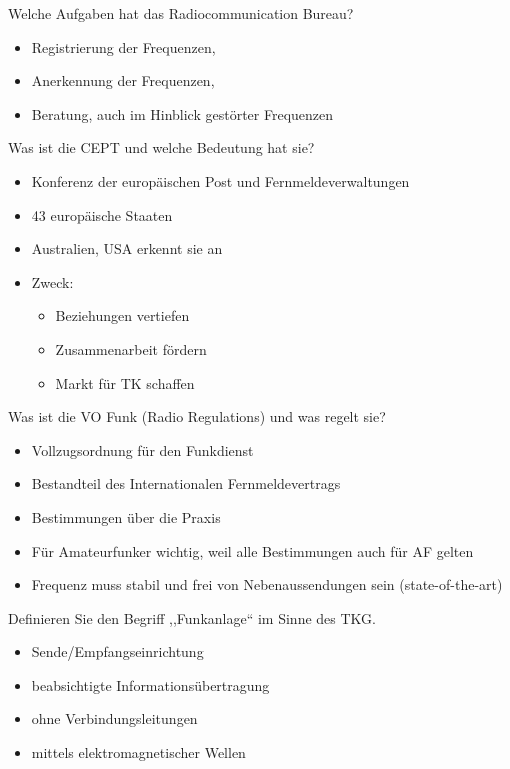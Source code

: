\documentclass[avery5371,grid,frame,a4paper]{flashcards}
\newcommand{\card}[3]{
  \begin{flashcard}[{\chap} -- #1]{#2}#3\end{flashcard}
}
\begin{document}
\card{04}{Welche Aufgaben hat das Radiocommunication Bureau?}{
  \begin{itemize}
    \item Registrierung der Frequenzen,
    \item Anerkennung der Frequenzen,
    \item Beratung, auch im Hinblick gestörter Frequenzen
 \end{itemize}
}
\card{05}{Was ist die CEPT und welche Bedeutung hat sie?}{
  \begin{itemize}
    \item Konferenz der europäischen Post und Fernmeldeverwaltungen
    \item 43 europäische Staaten
    \item Australien, USA erkennt sie an
    \item Zweck:
      \begin{itemize}
        \item Beziehungen vertiefen
        \item Zusammenarbeit fördern
        \item Markt für TK schaffen
      \end{itemize}
  \end{itemize}
}

\card{06}{Was ist die VO Funk (Radio Regulations) und was regelt sie?}{
  \begin{itemize}
    \item Vollzugsordnung für den Funkdienst
    \item Bestandteil des Internationalen Fernmeldevertrags
    \item Bestimmungen über die Praxis
    \item Für Amateurfunker wichtig, weil alle Bestimmungen auch für AF gelten
    \item Frequenz muss stabil und frei von Nebenaussendungen sein (state-of-the-art)
  \end{itemize}
}

\card{07}{Definieren Sie den Begriff ,,Funkanlage`` im Sinne des TKG.}{
  \begin{itemize}
    \item Sende/Empfangseinrichtung
    \item beabsichtigte Informationsübertragung
    \item ohne Verbindungsleitungen
    \item mittels elektromagnetischer Wellen
  \end{itemize}
}
\end{document}
